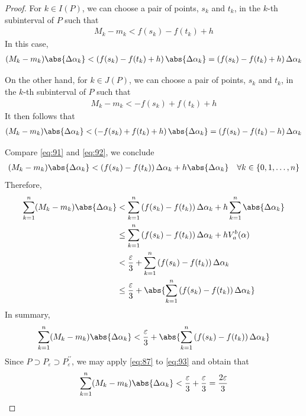 \documentclass[thmcnt=section, 12pt]{elegantbook}
\begin{document}
\begin{proof}
    \par For $k \in I(P)$, we can choose a pair of points, $s_k$ and $t_k$, in the $k$-th subinterval of $P$ such that 
    \begin{align*}
        M_k - m_k < f(s_k) - f(t_k) + h
    \end{align*}
    In this case, 
    \begin{align}
        (M_k - m_k)\abs{\Delta\alpha_k}
        < \left(f(s_k) - f(t_k) + h\right)\abs{\Delta\alpha_k}
        =  \left(f(s_k) - f(t_k) + h\right) \Delta\alpha_k
        \label{eq:91}
    \end{align}

    \par On the other hand, for $k \in J(P)$, we can choose a pair of points, $s_k$ and $t_k$, in the $k$-th subinterval of $P$ such that 
    \begin{align*}
        M_k - m_k < -f(s_k) + f(t_k) + h
    \end{align*}
    It then follows that
    \begin{align}
        (M_k - m_k)\abs{\Delta\alpha_k}
        < \left(-f(s_k) + f(t_k) + h\right)\abs{\Delta\alpha_k}
        =  \left(f(s_k) - f(t_k) - h\right) \Delta\alpha_k
        \label{eq:92}
    \end{align}

    \par Compare \eqref{eq:91} and \eqref{eq:92}, we conclude
    \begin{align*}
        (M_k - m_k)\abs{\Delta\alpha_k}
        < \left(f(s_k) - f(t_k)\right) \Delta\alpha_k
        + h \abs{\Delta\alpha_k}
        \quad \forall k \in \left\{0, 1, \ldots, n\right\}
    \end{align*}
    Therefore, 
    \begin{align*}
        \sum_{k=1}^n (M_k - m_k) \abs{\Delta\alpha_k}
        &< \sum_{k=1}^n \left(f(s_k) - f(t_k)\right) \Delta\alpha_k + h \sum_{k=1}^n \abs{\Delta\alpha_k} \\ 
        &\leq \sum_{k=1}^n \left(f(s_k) - f(t_k)\right) \Delta\alpha_k + h V_a^b (\alpha) \\ 
        &< \frac{\varepsilon}{3} + \sum_{k=1}^n \left(f(s_k) - f(t_k)\right)\Delta\alpha_k \\ 
        &\leq \frac{\varepsilon}{3} + \abs{\sum_{k=1}^n \left(f(s_k) - f(t_k)\right)\Delta\alpha_k}
    \end{align*}
    In summary,
    \begin{align}
        \sum_{k=1}^n (M_k - m_k) \abs{\Delta\alpha_k}
        < \frac{\varepsilon}{3} + \abs{\sum_{k=1}^n \left(f(s_k) - f(t_k)\right)\Delta\alpha_k}
        \label{eq:93}
    \end{align}
    Since $P \supset P_\varepsilon \supset P^{\prime\prime}_\varepsilon$, we may apply \eqref{eq:87} to \eqref{eq:93} and obtain that 
    \begin{align}
        \sum_{k=1}^n (M_k - m_k) \abs{\Delta\alpha_k}
        < \frac{\varepsilon}{3} + \frac{\varepsilon}{3}
        = \frac{2\varepsilon}{3}
        \label{eq:94}
    \end{align}


\end{proof}
\end{document}
